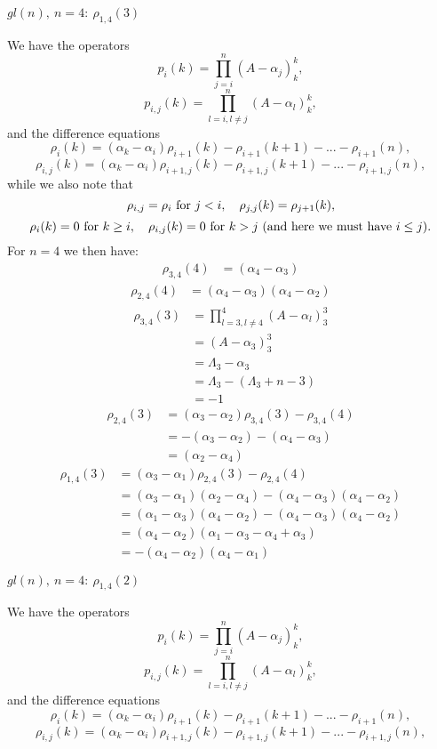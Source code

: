 \documentclass[12pt]{article}
\begin{document}
\begin{center}
{$gl(n),~n=4:~\rho_{1,4}(3)$}
\end{center}
We have the operators
$$
p_i(k) = \prod_{j=i}^n(A - \alpha_j)^k_k,
$$
$$
p_{i,j}(k) = \prod_{l=i,l \neq j}^n(A - \alpha_l)^k_k,
$$
and the difference equations
$$
\rho_i(k) = (\alpha_k - \alpha_i) \rho_{i+1}(k) - \rho_{i+1}(k+1) - ... - \rho_{i+1}(n),
$$
$$
\rho_{i,j}(k) = (\alpha_k - \alpha_i) \rho_{i+1,j}(k) - \rho_{i+1,j}(k+1) - ... - \rho_{i+1,j}(n),
$$
while we also note that
$$
\rho_{i,j} = \rho_i \hbox{~for~} j < i,~~~\rho_{j,j}(k) = \rho_{j+1}(k),
$$
$$
\rho_i(k) = 0 \hbox{~for~} k \geq i,~~~\rho_{i,j}(k) = 0 \hbox{~for~} k > j ~(\hbox{and here we must have~} i \leq j).
$$
For $n=4$ we then have:
\begin{align*}
\rho_{3,4}(4) &= (\alpha_4 - \alpha_3)
\end{align*}
\begin{align*}
\rho_{2,4}(4) &= (\alpha_4 - \alpha_3)(\alpha_4 - \alpha_2)
\end{align*}
\begin{align*}
\rho_{3,4}(3) &=  \prod_{l=3,l \neq 4}^4(A - \alpha_l)^3_3\\
&=  (A - \alpha_3)^3_3 \\
&= \Lambda_3 - \alpha_3 \\
&= \Lambda_3 - (\Lambda_3 + n - 3) \\
&= -1
\end{align*}
\begin{align*}
\rho_{2,4}(3) &= (\alpha_3 - \alpha_2) \rho_{3,4}(3) - \rho_{3,4}(4) \\
&= -(\alpha_3 - \alpha_2) - (\alpha_4 - \alpha_3) \\
&= (\alpha_2 - \alpha_4)
\end{align*}
\begin{align*}
\rho_{1,4}(3) &= (\alpha_3 - \alpha_1) \rho_{2,4}(3) - \rho_{2,4}(4) \\
&= (\alpha_3 - \alpha_1) (\alpha_2 - \alpha_4) - (\alpha_4 - \alpha_3)(\alpha_4 - \alpha_2)\\
&= (\alpha_1 - \alpha_3) (\alpha_4 - \alpha_2) - (\alpha_4 - \alpha_3)(\alpha_4 - \alpha_2) \\
&= (\alpha_4 - \alpha_2)(\alpha_1 - \alpha_3 - \alpha_4 + \alpha_3 ) \\
&= -(\alpha_4 - \alpha_2)(\alpha_4 - \alpha_1)
\end{align*}


\newpage
\begin{center}
{\large\bf $gl(n),~n=4:~\rho_{1,4}(2)$}
\end{center}
We have the operators
$$
p_i(k) = \prod_{j=i}^n(A - \alpha_j)^k_k,
$$
$$
p_{i,j}(k) = \prod_{l=i,l \neq j}^n(A - \alpha_l)^k_k,
$$
and the difference equations
$$
\rho_i(k) = (\alpha_k - \alpha_i) \rho_{i+1}(k) - \rho_{i+1}(k+1) - ... - \rho_{i+1}(n),
$$
$$
\rho_{i,j}(k) = (\alpha_k - \alpha_i) \rho_{i+1,j}(k) - \rho_{i+1,j}(k+1) - ... - \rho_{i+1,j}(n),
$$
\end{document}
